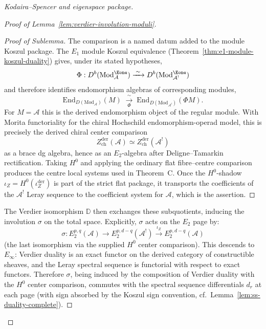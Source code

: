 \begin{proof}[Kodaira--Spencer and eigenspace package]
\begin{proof}[Proof of Lemma~\ref{lem:verdier-involution-moduli}]
\begin{proof}[Proof of Sublemma]
The comparison is a named datum added to the module Koszul package.
The $E_1$ module Koszul equivalence
(Theorem~\ref{thm:e1-module-koszul-duality}) gives, under its stated
hypotheses,
\begin{equation}
\Phi: D^b(\mathrm{Mod}^{\Eone}_{\mathcal{A}}) \xrightarrow{\;\sim\;}
D^b(\mathrm{Mod}^{\Eone}_{\mathcal{A}^!})
\end{equation}
and therefore identifies endomorphism algebras of corresponding modules,
\begin{equation}
\mathrm{End}_{D(\mathrm{Mod}_{\mathcal{A}})}(M)
\;\xrightarrow[\Phi]{\;\sim\;}\;
\mathrm{End}_{D(\mathrm{Mod}_{\mathcal{A}^!})}(\Phi M).
\end{equation}
For $M=\mathcal{A}$ this is the derived endomorphism object of the
regular module. With Morita functoriality for the chiral Hochschild
endomorphism-operad model, this is precisely the derived chiral center
comparison
\[
 Z^{\mathrm{der}}_{\mathrm{ch}}(\mathcal A)
 \simeq
 Z^{\mathrm{der}}_{\mathrm{ch}}(\mathcal A^!)
\]
as a brace dg algebra, hence as an \(E_2\)-algebra after
Deligne--Tamarkin rectification.  Taking \(H^0\) and applying the
ordinary flat fibre--centre comparison produces the centre local
systems used in Theorem~C.  Once the \(H^0\)-shadow
\(\iota_Z=H^0(\iota_Z^{\mathrm{der}})\) is part of the strict flat
package, it transports the coefficients of the \(\mathcal{A}^!\)
Leray sequence to the coefficient system for \(\mathcal{A}\), which
is the assertion.
\end{proof}

The Verdier isomorphism
$\mathbb{D}$ then exchanges these subquotients, inducing the involution
$\sigma$ on the total space. Explicitly, $\sigma$ acts on the $E_2$ page by:
\begin{equation}
\sigma: E_2^{p,q}(\mathcal{A}) \to E_2^{p,d-q}(\mathcal{A}^!) \xrightarrow{\iota_Z}
E_2^{p,d-q}(\mathcal{A})
\end{equation}
(the last isomorphism via the supplied $H^0$ center comparison). This descends to $E_\infty$:
Verdier duality is an exact functor on the derived category of constructible sheaves,
and the Leray spectral sequence is functorial with respect to exact functors.
Therefore $\sigma$, being induced by the composition of Verdier duality with the
$H^0$ center comparison, commutes with the spectral sequence differentials $d_r$
at each page (with sign absorbed by the Koszul sign convention, cf.\
Lemma~\ref{lem:ss-duality-complete}).


\end{proof}
\end{proof}
